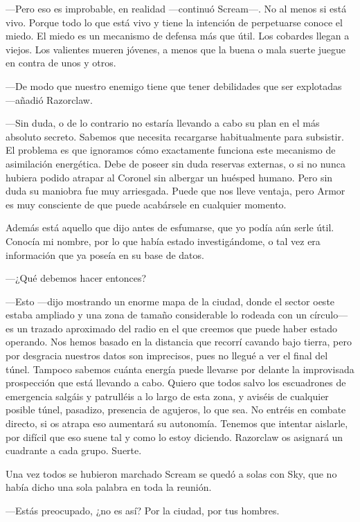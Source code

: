 ---Pero eso es improbable, en realidad ---continuó Scream---. No al menos si está vivo. Porque todo lo que está vivo y tiene la intención de perpetuarse conoce el miedo. El miedo es un mecanismo de defensa más que útil. Los cobardes llegan a viejos. Los valientes mueren jóvenes, a menos que la buena o mala suerte juegue en contra de unos y otros.

---De modo que nuestro enemigo tiene que tener debilidades que ser explotadas ---añadió Razorclaw.

---Sin duda, o de lo contrario no estaría llevando a cabo su plan en el más absoluto secreto. Sabemos que necesita recargarse habitualmente para subsistir. El problema es que ignoramos cómo exactamente funciona este mecanismo de asimilación energética. Debe de poseer sin duda reservas externas, o si no nunca hubiera podido atrapar al Coronel sin albergar un huésped humano. Pero sin duda su maniobra fue muy arriesgada. Puede que nos lleve ventaja, pero Armor es muy consciente de que puede acabársele en cualquier momento.

\rquoti{}Además está aquello que dijo antes de esfumarse, que yo podía aún serle útil. Conocía mi nombre, por lo que había estado investigándome, o tal vez era información que ya poseía en su base de datos.

---¿Qué debemos hacer entonces?

---Esto ---dijo mostrando un enorme mapa de la ciudad, donde el sector oeste estaba ampliado y una zona de tamaño considerable lo rodeada con un círculo--- es un trazado aproximado del radio en el que creemos que puede haber estado operando. Nos hemos basado en la distancia que recorrí cavando bajo tierra, pero por desgracia nuestros datos son imprecisos, pues no llegué a ver el final del túnel. Tampoco sabemos cuánta energía puede llevarse por delante la improvisada prospección que está llevando a cabo. Quiero que todos salvo los escuadrones de emergencia salgáis y patrulléis a lo largo de esta zona, y aviséis de cualquier posible túnel, pasadizo, presencia de agujeros, lo que sea. No entréis en combate directo, si os atrapa eso aumentará su autonomía. Tenemos que intentar aislarle, por difícil que eso suene tal y como lo estoy diciendo. Razorclaw os asignará un cuadrante a cada grupo. Suerte.

Una vez todos se hubieron marchado Scream se quedó a solas con Sky, que no había dicho una sola palabra en toda la reunión.

---Estás preocupado, ¿no es así? Por la ciudad, por tus hombres.

